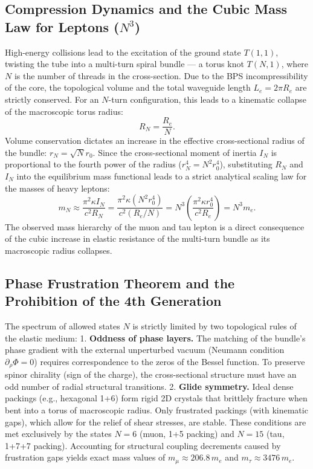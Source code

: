 \documentclass[12pt,a4paper]{article}
\begin{document}
\subsection{Compression Dynamics and the Cubic Mass Law for Leptons ($N^3$)}
High-energy collisions lead to the excitation of the ground state $T(1,1)$, twisting the tube into a multi-turn spiral bundle — a torus knot $T(N,1)$, where $N$ is the number of threads in the cross-section.
Due to the BPS incompressibility of the core, the topological volume and the total waveguide length $L_e = 2\pi R_e$ are strictly conserved. For an $N$-turn configuration, this leads to a kinematic collapse of the macroscopic torus radius:
\begin{equation}
	R_N = \frac{R_e}{N}.
\end{equation}
Volume conservation dictates an increase in the effective cross-sectional radius of the bundle: $r_N = \sqrt{N} r_0$. Since the cross-sectional moment of inertia $I_N$ is proportional to the fourth power of the radius ($r_N^4 = N^2 r_0^4$), substituting $R_N$ and $I_N$ into the equilibrium mass functional leads to a strict analytical scaling law for the masses of heavy leptons:
\begin{equation}
	m_N \approx \frac{\pi^2 \kappa I_N}{c^2 R_N} = \frac{\pi^2 \kappa (N^2 r_0^4)}{c^2 (R_e / N)} = N^3 \left( \frac{\pi^2 \kappa r_0^4}{c^2 R_e} \right) = N^3 m_e.
	\label{eq:cubic_mass_law}
\end{equation}
The observed mass hierarchy of the muon and tau lepton is a direct consequence of the cubic increase in elastic resistance of the multi-turn bundle as its macroscopic radius collapses.

\subsection{Phase Frustration Theorem and the Prohibition of the 4th Generation}
The spectrum of allowed states $N$ is strictly limited by two topological rules of the elastic medium:
1. \textbf{Oddness of phase layers.} The matching of the bundle's phase gradient with the external unperturbed vacuum (Neumann condition $\partial_\rho \Phi = 0$) requires correspondence to the zeros of the Bessel function. To preserve spinor chirality (sign of the charge), the cross-sectional structure must have an odd number of radial structural transitions.
2. \textbf{Glide symmetry.} Ideal dense packings (e.g., hexagonal 1+6) form rigid 2D crystals that brittlely fracture when bent into a torus of macroscopic radius. Only frustrated packings (with kinematic gaps), which allow for the relief of shear stresses, are stable.
These conditions are met exclusively by the states $N=6$ (muon, 1+5 packing) and $N=15$ (tau, 1+7+7 packing). Accounting for structural coupling decrements caused by frustration gaps yields exact mass values of $m_\mu \approx 206.8 \, m_e$ and $m_\tau \approx 3476 \, m_e$.
\end{document}

